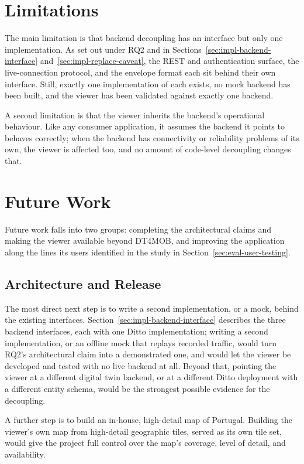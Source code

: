 \section{Limitations}
\label{sec:conc-limitations}

The main limitation is that backend decoupling has an interface but only one implementation. As set out under RQ2 and in Sections~\ref{sec:impl-backend-interface} and~\ref{sec:impl-replace-caveat}, the REST and authentication surface, the live-connection protocol, and the envelope format each sit behind their own interface. Still, exactly one implementation of each exists, no mock backend has been built, and the viewer has been validated against exactly one backend.

A second limitation is that the viewer inherits the backend's operational behaviour. Like any consumer application, it assumes the backend it points to behaves correctly; when the backend has connectivity or reliability problems of its own, the viewer is affected too, and no amount of code-level decoupling changes that.

\section{Future Work}
\label{sec:conc-future}

Future work falls into two groups: completing the architectural claims and making the viewer available beyond DT4MOB, and improving the application along the lines its users identified in the study in Section~\ref{sec:eval-user-testing}.

\subsection{Architecture and Release}

The most direct next step is to write a second implementation, or a mock, behind the existing interfaces. Section~\ref{sec:impl-backend-interface} describes the three backend interfaces, each with one Ditto implementation; writing a second implementation, or an offline mock that replays recorded traffic, would turn RQ2's architectural claim into a demonstrated one, and would let the viewer be developed and tested with no live backend at all. Beyond that, pointing the viewer at a different digital twin backend, or at a different Ditto deployment with a different entity schema, would be the strongest possible evidence for the decoupling.

A further step is to build an in-house, high-detail map of Portugal. Building the viewer's own map from high-detail geographic tiles, served as its own tile set, would give the project full control over the map's coverage, level of detail, and availability.

